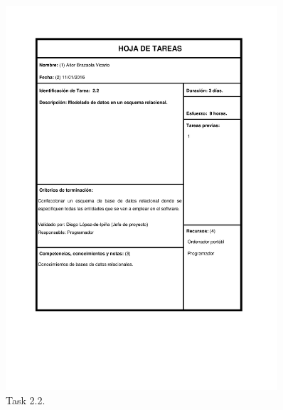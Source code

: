 \documentclass{DeustoFDP}
\begin{document}
\begin{figure}[H]
	\centering
	\includegraphics[width=0.9\textwidth]{fig/Tareas/22}
	\caption{Task 2.2.}
	\label{fig:t22}
\end{figure}
\end{document}
